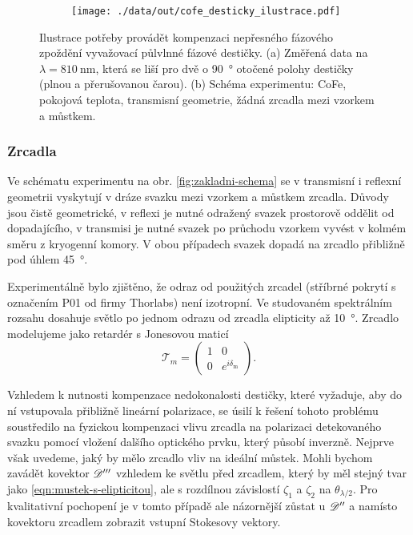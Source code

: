 \begin{figure}[htbp]
    \centering
    \begin{subfigure}{.55\textwidth}
        \centering
        \texttt{[image: ./data/out/cofe\_desticky\_ilustrace.pdf]}
    \end{subfigure}
    \begin{subfigure}{.43\textwidth}
        \centering
    \end{subfigure}
    \caption{Ilustrace potřeby provádět kompenzaci nepřesného fázového zpoždění vyvažovací půlvlnné fázové destičky. (a) Změřená data na $\lambda=\SI{810}{\nano\meter}$, která se liší pro dvě o \SI{90}{\degree} otočené polohy destičky (plnou a přerušovanou čarou). (b) Schéma experimentu: CoFe, pokojová teplota, transmisní geometrie, žádná zrcadla mezi vzorkem a můstkem.}
    \label{fig:mustek-desticka-ilustrace}
\end{figure}

\subsubsection*{Zrcadla}

Ve schématu experimentu na obr. \ref{fig:zakladni-schema} se v transmisní i reflexní geometrii vyskytují v dráze svazku mezi vzorkem a můstkem zrcadla.
Důvody jsou čistě geometrické, v reflexi je nutné odražený svazek prostorově oddělit od dopadajícího, v transmisi je nutné svazek po průchodu vzorkem vyvést v kolmém směru z kryogenní komory.
V obou případech svazek dopadá na zrcadlo přibližně pod úhlem \SI{45}{\degree}.

Experimentálně bylo zjištěno, že odraz od použitých zrcadel (stříbrné pokrytí s označením P01 od firmy Thorlabs) není izotropní.
Ve studovaném spektrálním rozsahu dosahuje světlo po jednom odrazu od zrcadla elipticity až \SI{10}{\degree}.
Zrcadlo modelujeme jako retardér s Jonesovou maticí
\begin{equation}
    \mathcal{T}_m = \begin{pmatrix} 1&0\\0&e^{i\delta_\textrm{m}} \end{pmatrix} .
\end{equation}

Vzhledem k nutnosti kompenzace nedokonalosti destičky, které vyžaduje, aby do ní vstupovala přibližně lineární polarizace, se úsilí k řešení tohoto problému soustředilo na fyzickou kompenzaci vlivu zrcadla na polarizaci detekovaného svaz\-ku pomocí vložení dalšího optického prvku, který působí inverzně.
Nejprve však uvedeme, jaký by mělo zrcadlo vliv na ideální můstek.
Mohli bychom zavádět kovektor $\mathscr{D}'''$ vzhledem ke světlu před zrcadlem, který by měl stejný tvar jako \eqref{eqn:mustek-s-elipticitou}, ale s rozdílnou závislostí $\zeta_1$ a $\zeta_2$ na $\theta_{\lambda/2}$.
Pro kvalitativní pochopení je v tomto případě ale názornější zůstat u $\mathscr{D}''$ a namísto kovektoru zrcadlem zobrazit vstupní Stokesovy vektory.

